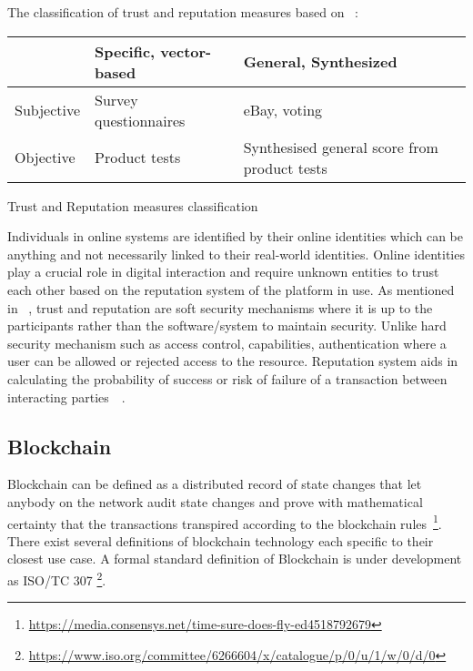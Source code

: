 The classification of trust and reputation measures based on 
 ~\cite{ josang2007survey}: 
\begin{center}
	\begin{tabularx}{\textwidth }{|X| X| X| }
		\hline
		 & Specific, vector-based & General, Synthesized \\
		 \hline
		Subjective & Survey questionnaires & eBay, voting \\
		\hline
		Objective & Product tests & Synthesised general score from product tests 
		\hline
	\end{tabularx}
	\caption{Trust and Reputation measures classification}
\end{center}
Individuals in online systems are identified by their online identities which
can be anything and not necessarily linked to their real-world identities.
Online identities play a crucial role in digital interaction and require
unknown entities to trust each other based on the reputation system of the
platform in use. As mentioned in ~\cite{rasmusson1996simulated}, trust and
reputation are soft security mechanisms where it is up to the participants
rather than the software/system to maintain security. Unlike hard security
mechanism such as access control, capabilities, authentication where a user can
be allowed or rejected access to the resource. Reputation system aids in
calculating the probability of success or risk of failure of a transaction
between interacting parties~\cite{mui2002notions}~\cite{carbone2003formal}.


\subsection{Blockchain}
Blockchain can be defined as a distributed record of state changes that let
anybody on the network audit state changes and prove with mathematical
certainty that the transactions transpired according to the blockchain
rules~\footnote{\url{https://media.consensys.net/time-sure-does-fly-ed4518792679}}.
There exist several definitions of blockchain technology each specific to their
closest use case. A formal standard definition of Blockchain is under
development as ISO/TC 307
\footnote{\url{https://www.iso.org/committee/6266604/x/catalogue/p/0/u/1/w/0/d/0}}. \\


